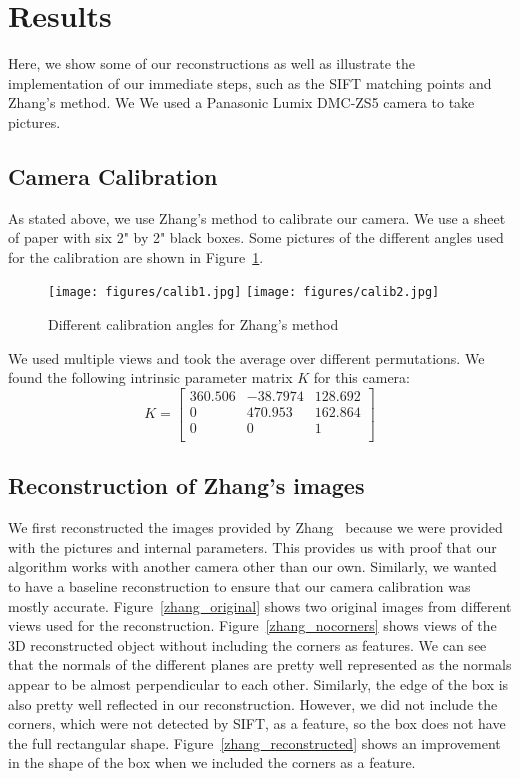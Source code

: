 \section{Results}
\label{s:results}

Here, we show some of our reconstructions as well as illustrate the implementation of our immediate steps, such as the SIFT matching points and Zhang's method. We We used a Panasonic Lumix DMC-ZS5 camera to take pictures.

\subsection{Camera Calibration}
As stated above, we use Zhang's method to calibrate our camera. We use a sheet of paper with six 2" by 2" black boxes. Some pictures of the different angles used for the calibration are shown in Figure~\ref{calib_pics}. 

\begin{figure}[H]
\begin{center}
\texttt{[image: figures/calib1.jpg]}
\texttt{[image: figures/calib2.jpg]}
\end{center}
\caption{Different calibration angles for Zhang's method}
\label{calib_pics}
\end{figure}

We used multiple views and took the average over different permutations. We found the following intrinsic parameter matrix $K$ for this camera:
\begin{equation*}
K =
  \left[ {\begin{array}{ccc}
   360.506 & -38.7974 & 128.692  \\
  0 & 470.953 & 162.864 \\
   0 & 0 & 1 \\
  \end{array} } \right]
\end{equation*}

\subsection{Reconstruction of Zhang's images}
We first reconstructed the images provided by Zhang~\cite{Calibration} because we were provided with the pictures and internal parameters. This provides us with proof that our algorithm works with another camera other than our own. Similarly, we wanted to have a baseline reconstruction to ensure that our camera calibration was mostly accurate. Figure~\ref{zhang_original} shows two original images from different views used for the reconstruction. Figure~\ref{zhang_nocorners} shows views of the 3D reconstructed object without including the corners as features. We can see that the normals of the different planes are pretty well represented as the normals appear to be almost perpendicular to each other. Similarly, the edge of the box is also pretty well reflected in our reconstruction. However, we did not include the corners, which were not detected by SIFT, as a feature, so the box does not have the full rectangular shape. Figure~\ref{zhang_reconstructed} shows an improvement in the shape of the box when we included the corners as a feature.

